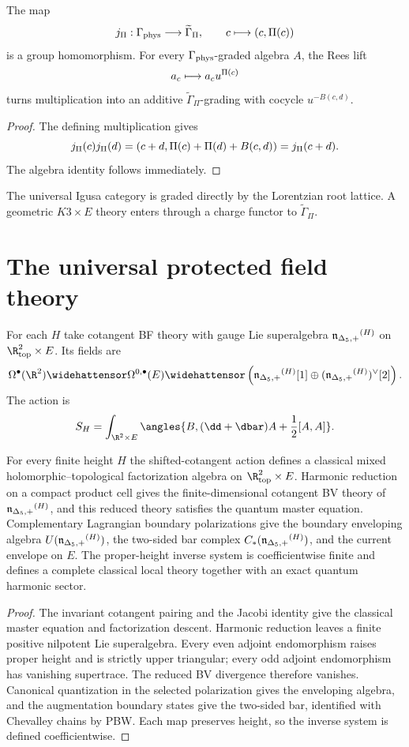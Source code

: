 \begin{theorem}
The map
\[
 j_\Pi:\Gamma_{\mathrm{phys}}\longrightarrow\widetilde\Gamma_\Pi,
 \qquad
 c\longmapsto(c,\Pi(c))
\]
is a group homomorphism.  For every $\Gamma_{\mathrm{phys}}$-graded algebra $A$, the Rees lift
\[
 a_c\longmapsto a_cu^{\Pi(c)}
\]
turns multiplication into an additive $\widetilde\Gamma_\Pi$-grading with cocycle $u^{-B(c,d)}$.
\end{theorem}
\begin{proof}
The defining multiplication gives
\[
 j_\Pi(c)j_\Pi(d)
 =(c+d,\Pi(c)+\Pi(d)+B(c,d))
 =j_\Pi(c+d).
\]
The algebra identity follows immediately.
\end{proof}

The universal Igusa category is graded directly by the Lorentzian root lattice.  A geometric $K3\times E$ theory enters through a charge functor to $\widetilde\Gamma_\Pi$.

\chapter{The universal protected field theory}
For each $H$ take cotangent BF theory with gauge Lie superalgebra ${\mathfrak n_{\Delta_5,+}}^{(H)}$ on $\R^2_{\mathrm{top}}\times E$.  Its fields are
\[
 \Omega^\bullet(\R^2)\widehattensor
 \Omega^{0,\bullet}(E)
 \widehattensor
 \left(\nIg^{(H)}[1]\oplus(\nIg^{(H)})^\vee[2]\right).
\]
The action is
\[
 S_H=\int_{\R^2\times E}
 \angles{B,(\dd+\dbar)A+\frac12[A,A]}.
\]

\begin{theorem}
For every finite height $H$ the shifted-cotangent action defines a classical mixed holomorphic--topological factorization algebra on $\R^2_{\mathrm{top}}\times E$.  Harmonic reduction on a compact product cell gives the finite-dimensional cotangent BV theory of ${\mathfrak n_{\Delta_5,+}}^{(H)}$, and this reduced theory satisfies the quantum master equation.  Complementary Lagrangian boundary polarizations give the boundary enveloping algebra $U({\mathfrak n_{\Delta_5,+}}^{(H)})$, the two-sided bar complex $C_*({\mathfrak n_{\Delta_5,+}}^{(H)})$, and the current envelope on $E$.  The proper-height inverse system is coefficientwise finite and defines a complete classical local theory together with an exact quantum harmonic sector.
\end{theorem}
\begin{proof}
The invariant cotangent pairing and the Jacobi identity give the classical master equation and factorization descent.  Harmonic reduction leaves a finite positive nilpotent Lie superalgebra.  Every even adjoint endomorphism raises proper height and is strictly upper triangular; every odd adjoint endomorphism has vanishing supertrace.  The reduced BV divergence therefore vanishes.  Canonical quantization in the selected polarization gives the enveloping algebra, and the augmentation boundary states give the two-sided bar, identified with Chevalley chains by PBW.  Each map preserves height, so the inverse system is defined coefficientwise.
\end{proof}


